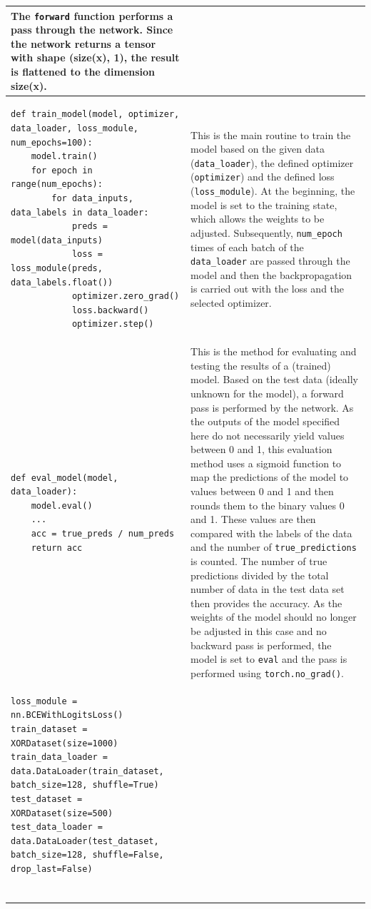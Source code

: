 \begin{longtable}{|m{}|m{}|}
The \lstinline|forward| function performs a pass through the network. Since the network returns a tensor with shape (size(x), 1), the result is flattened to the dimension size(x).\\ \hline
\begin{lstlisting}
def train_model(model, optimizer, data_loader, loss_module, num_epochs=100):
    model.train()
    for epoch in range(num_epochs):
        for data_inputs, data_labels in data_loader:
            preds = model(data_inputs)
            loss = loss_module(preds, data_labels.float())
            optimizer.zero_grad()
            loss.backward()
            optimizer.step()
\end{lstlisting} & This is the main routine to train the model based on the given data (\lstinline|data_loader|), the defined optimizer (\lstinline|optimizer|) and the defined loss (\lstinline|loss_module|). At the beginning, the model is set to the training state, which allows the weights to be adjusted. Subsequently, \lstinline|num_epoch| times of each batch of the \lstinline|data_loader| are passed through the model and then the backpropagation is carried out with the loss and the selected optimizer.\\ \hline
\begin{lstlisting}
def eval_model(model, data_loader):
    model.eval()
    ...
    acc = true_preds / num_preds
    return acc
\end{lstlisting} & This is the method for evaluating and testing the results of a (trained) model. Based on the test data (ideally unknown for the model), a forward pass is performed by the network. As the outputs of the model specified here do not necessarily yield values between 0 and 1, this evaluation method uses a sigmoid function to map the predictions of the model to values between 0 and 1 and then rounds them to the binary values 0 and 1. These values are then compared with the labels of the data and the number of \lstinline|true_predictions| is counted. The number of true predictions divided by the total number of data in the test data set then provides the accuracy. As the weights of the model should no longer be adjusted in this case and no backward pass is performed, the model is set to \lstinline|eval| and the pass is performed using \lstinline|torch.no_grad()|.\\ \hline
\begin{lstlisting}
loss_module = nn.BCEWithLogitsLoss()
train_dataset = XORDataset(size=1000)
train_data_loader = data.DataLoader(train_dataset, batch_size=128, shuffle=True)
test_dataset = XORDataset(size=500)
test_data_loader = data.DataLoader(test_dataset, batch_size=128, shuffle=False, drop_last=False)


\end{lstlisting}
\end{longtable}
